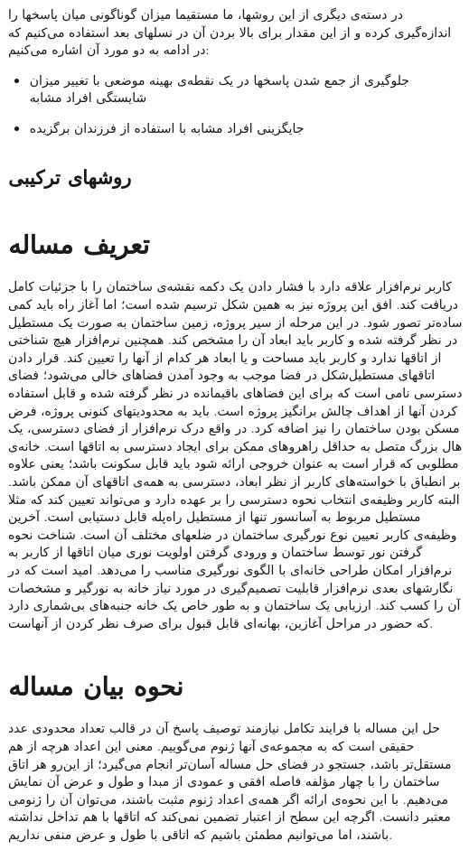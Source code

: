 \documentclass{report}
\begin{document}
در دسته‌ی دیگری از این روشها، ما مستقیما میزان گوناگونی میان پاسخها را اندازه‌گیری کرده و از این مقدار برای بالا بردن آن در نسلهای بعد استفاده می‌کنیم که در ادامه به دو مورد آن اشاره می‌کنیم:
\begin{itemize}
\item
جلوگیری از جمع شدن پاسخها در یک نقطه‌ی بهینه موضعی با تغییر میزان شایستگی افراد مشابه
\item
جایگزینی افراد مشابه با استفاده از فرزندان برگزیده
\end{itemize}

\subsection{روشهای ترکیبی}

\section{تعریف مساله}
کاربر نرم‌افزار علاقه دارد با فشار دادن یک دکمه نقشه‌ی ساختمان را با جزئیات کامل دریافت کند. افق این پروژه نیز به همین شکل ترسیم شده است؛ اما آغاز راه باید کمی ساده‌تر تصور شود. در این مرحله از سیر پروژه، زمین ساختمان به صورت یک مستطیل در نظر گرفته شده و کاربر باید ابعاد آن را مشخص کند. همچنین نرم‌افزار هیچ شناختی از اتاقها ندارد و کاربر باید مساحت و یا ابعاد هر کدام از آنها را تعیین کند. قرار دادن اتاقهای مستطیل‌شکل در فضا موجب به وجود آمدن فضاهای خالی می‌شود؛ فضای دسترسی نامی است که برای این فضاهای باقیمانده در نظر گرفته شده و قابل استفاده کردن آنها از اهداف چالش برانگیز پروژه است. باید به محدودیتهای کنونی پروژه، فرض مسکن بودن ساختمان را نیز اضافه کرد. در واقع درک نرم‌افزار از فضای دسترسی، یک هال بزرگ متصل به حداقل راهروهای ممکن برای ایجاد دسترسی به اتاقها است.
خانه‌ی مطلوبی که قرار است به عنوان خروجی ارائه شود باید قابل سکونت باشد؛ یعنی علاوه بر انطباق با خواسته‌های کاربر از نظر ابعاد، دسترسی به همه‌ی اتاقهای آن ممکن باشد. البته کاربر وظیفه‌ی انتخاب نحوه دسترسی را بر عهده دارد و می‌تواند تعیین کند که مثلا مستطیل مربوط به آسانسور تنها از مستطیل راه‌پله قابل دستیابی است. 
آخرین وظیفه‌ی کاربر تعیین نوع نورگیری ساختمان در ضلعهای مختلف آن است. شناخت نحوه گرفتن نور توسط ساختمان و ورودی گرفتن اولویت نوری میان اتاقها از کاربر به نرم‌افزار امکان طراحی خانه‌ای با الگوی نورگیری مناسب را می‌دهد. امید است که در نگارشهای بعدی نرم‌افزار قابلیت تصمیم‌گیری در مورد نیاز خانه به نورگیر و مشخصات آن را کسب کند. ارزیابی یک ساختمان و به طور خاص یک خانه جنبه‌های بی‌شماری دارد که حضور در مراحل آغازین، بهانه‌ای قابل قبول برای صرف نظر کردن از آنهاست.

\section{نحوه بیان مساله}
حل این مساله با فرایند تکامل نیازمند توصیف پاسخ آن در قالب تعداد محدودی عدد حقیقی است که به مجموعه‌ی آنها ژنوم می‌گوییم. معنی این اعداد هرچه از هم مستقل‌تر باشد، جستجو در فضای حل مساله آسان‌تر انجام می‌گیرد؛ از این‌رو هر اتاق ساختمان را با چهار مؤلفه فاصله افقی و عمودی از مبدا و طول و عرض آن نمایش می‌دهیم. با این نحوه‌ی ارائه اگر همه‌ی اعداد ژنوم مثبت باشند، می‌توان آن را ژنومی معتبر دانست. اگرچه این سطح از اعتبار تضمین نمی‌کند که اتاقها با هم تداخل نداشته باشند، اما می‌توانیم مطمئن باشیم که اتاقی با طول و عرض منفی نداریم.
\end{document}
